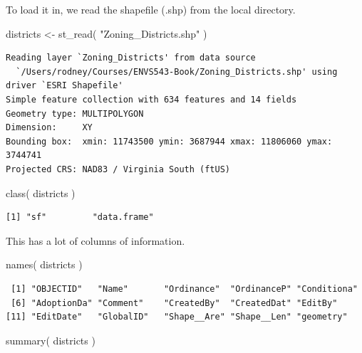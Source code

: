 \documentclass[
  letterpaper,
]{book}
\newenvironment{Shaded}{\begin{snugshade}}{\end{snugshade}}
\newcommand{\FunctionTok}[1]{\textcolor[rgb]{0.28,0.35,0.67}{#1}}
\newcommand{\NormalTok}[1]{\textcolor[rgb]{0.00,0.23,0.31}{#1}}
\newcommand{\OtherTok}[1]{\textcolor[rgb]{0.00,0.23,0.31}{#1}}
\newcommand{\StringTok}[1]{\textcolor[rgb]{0.13,0.47,0.30}{#1}}
\begin{document}
To load it in, we read the shapefile (.shp) from the local directory.

\begin{Shaded}
\begin{Highlighting}[]
\NormalTok{districts }\OtherTok{\textless{}{-}} \FunctionTok{st\_read}\NormalTok{( }\StringTok{"Zoning\_Districts.shp"}\NormalTok{ )}
\end{Highlighting}
\end{Shaded}

\begin{verbatim}
Reading layer `Zoning_Districts' from data source 
  `/Users/rodney/Courses/ENVS543-Book/Zoning_Districts.shp' using driver `ESRI Shapefile'
Simple feature collection with 634 features and 14 fields
Geometry type: MULTIPOLYGON
Dimension:     XY
Bounding box:  xmin: 11743500 ymin: 3687944 xmax: 11806060 ymax: 3744741
Projected CRS: NAD83 / Virginia South (ftUS)
\end{verbatim}

\begin{Shaded}
\begin{Highlighting}[]
\FunctionTok{class}\NormalTok{( districts )}
\end{Highlighting}
\end{Shaded}

\begin{verbatim}
[1] "sf"         "data.frame"
\end{verbatim}

This has a lot of columns of information.

\begin{Shaded}
\begin{Highlighting}[]
\FunctionTok{names}\NormalTok{( districts )}
\end{Highlighting}
\end{Shaded}

\begin{verbatim}
 [1] "OBJECTID"   "Name"       "Ordinance"  "OrdinanceP" "Conditiona"
 [6] "AdoptionDa" "Comment"    "CreatedBy"  "CreatedDat" "EditBy"    
[11] "EditDate"   "GlobalID"   "Shape__Are" "Shape__Len" "geometry"  
\end{verbatim}

\begin{Shaded}
\begin{Highlighting}[]
\FunctionTok{summary}\NormalTok{( districts )}
\end{Highlighting}
\end{Shaded}
\end{document}
